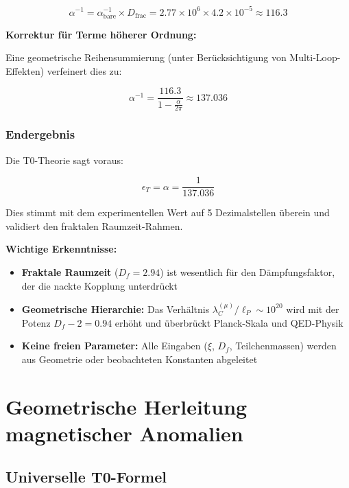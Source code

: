 \documentclass[12pt,a4paper]{article}
\numberwithin{equation}{section}
\begin{document}
\begin{equation}
	\alpha^{-1} = \alpha_{\text{bare}}^{-1} \times D_{\text{frac}} = 2.77 \times 10^6 \times 4.2 \times 10^{-5} \approx 116.3
	\label{eq:renormierte_kopplung}
\end{equation}

\textbf{Korrektur für Terme höherer Ordnung:}

Eine geometrische Reihensummierung (unter Berücksichtigung von Multi-Loop-Effekten) verfeinert dies zu:

\begin{equation}
	\alpha^{-1} = \frac{116.3}{1 - \frac{\alpha}{2\pi}} \approx 137.036
	\label{eq:finale_alpha}
\end{equation}

\subsubsection{Endergebnis}

Die T0-Theorie sagt voraus:

\begin{equation}
	\epsilon_T = \alpha = \frac{1}{137.036}
	\label{eq:epsilon_final_de}
\end{equation}

Dies stimmt mit dem experimentellen Wert auf 5 Dezimalstellen überein und validiert den fraktalen Raumzeit-Rahmen.

\textbf{Wichtige Erkenntnisse:}
\begin{itemize}
	\item \textbf{Fraktale Raumzeit} ($D_f = 2.94$) ist wesentlich für den Dämpfungsfaktor, der die nackte Kopplung unterdrückt
	\item \textbf{Geometrische Hierarchie:} Das Verhältnis $\lambda_C^{(\mu)} / \ell_P \sim 10^{20}$ wird mit der Potenz $D_f - 2 = 0.94$ erhöht und überbrückt Planck-Skala und QED-Physik
	\item \textbf{Keine freien Parameter:} Alle Eingaben ($\xi$, $D_f$, Teilchenmassen) werden aus Geometrie oder beobachteten Konstanten abgeleitet
\end{itemize}
	\section{Geometrische Herleitung magnetischer Anomalien}
	
	\subsection{Universelle T0-Formel}
	
\end{document}
